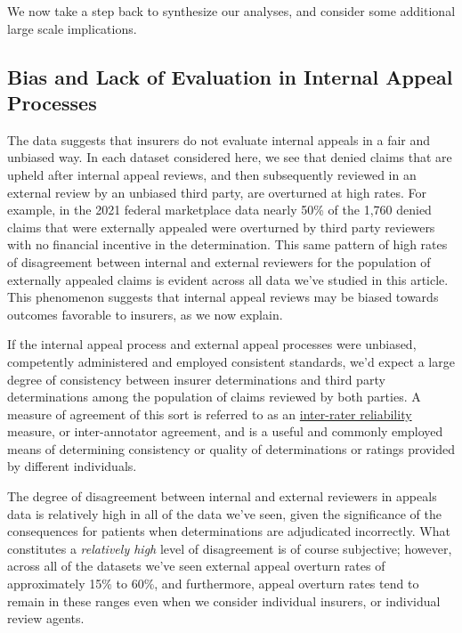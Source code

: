\documentclass[12pt, a4paper,twoside]{report}
\theoremstyle{plain} %
\theoremstyle{definition} %
\theoremstyle{remark} %
\numberwithin{equation}{chapter}
\begin{document}
		We now take a step back to synthesize our analyses, and consider some additional large scale implications.
		
		\subsection{Bias and Lack of Evaluation in Internal Appeal Processes}
		
		The data suggests that insurers do not evaluate internal appeals in a fair and unbiased way. In each dataset considered here, we see that denied claims that are upheld after internal appeal reviews, and then subsequently reviewed in an external review by an unbiased third party, are overturned at high rates. For example, in the 2021 federal marketplace data nearly 50\% of the 1,760 denied claims that were externally appealed were overturned by third party reviewers with no financial incentive in the determination. This same pattern of high rates of disagreement between internal and external reviewers for the population of externally appealed claims is evident across all data we've studied in this article. This phenomenon suggests that internal appeal reviews may be biased towards outcomes favorable to insurers, as we now explain.
		
		If the internal appeal process and external appeal processes were unbiased, competently administered and employed consistent standards, we'd expect a large degree of consistency between insurer determinations and third party determinations among the population of claims reviewed by both parties. A measure of agreement of this sort is referred to as an \href{https://en.wikipedia.org/wiki/Inter-rater_reliability}{inter-rater reliability} measure, or inter-annotator agreement, and is a useful and commonly employed means of determining consistency or quality of determinations or ratings provided by different individuals.
		
		The degree of disagreement between internal and external reviewers in appeals data is relatively high in all of the data we've seen, given the significance of the consequences for patients when determinations are adjudicated incorrectly. What constitutes a \emph{relatively high} level of disagreement is of course subjective; however, across all of the datasets we've seen external appeal overturn rates of approximately 15\% to 60\%, and furthermore, appeal overturn rates tend to remain in these ranges even when we consider individual insurers, or individual review agents.
		
\end{document}
